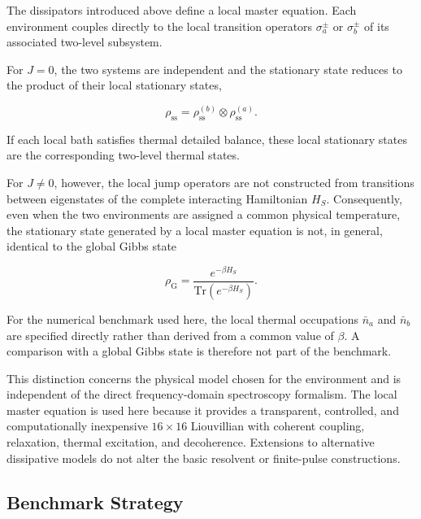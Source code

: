 \documentclass[11pt]{article}
\begin{document}
The dissipators introduced above define a local master equation. Each
environment couples directly to the local transition operators
$\sigma_a^\pm$ or $\sigma_b^\pm$ of its associated two-level
subsystem.

For $J=0$, the two systems are independent and the stationary state
reduces to the product of their local stationary states,

\begin{equation}
\boxed{
\rho_{\mathrm{ss}}
=
\rho_{\mathrm{ss}}^{(b)}
\otimes
\rho_{\mathrm{ss}}^{(a)}.
}
\label{eq:uncoupled_thermal_state}
\end{equation}

If each local bath satisfies thermal detailed balance, these local
stationary states are the corresponding two-level thermal states.

For $J\neq0$, however, the local jump operators are not constructed
from transitions between eigenstates of the complete interacting
Hamiltonian $H_S$. Consequently, even when the two environments are
assigned a common physical temperature, the stationary state generated
by a local master equation is not, in general, identical to the global
Gibbs state

\begin{equation}
\rho_{\mathrm{G}}
=
\frac{
e^{-\beta H_S}
}{
\mathrm{Tr}
\left(
e^{-\beta H_S}
\right)
}.
\end{equation}

For the numerical benchmark used here, the local thermal occupations
$\bar n_a$ and $\bar n_b$ are specified directly rather than derived
from a common value of $\beta$. A comparison with a global Gibbs state
is therefore not part of the benchmark.

This distinction concerns the physical model chosen for the
environment and is independent of the direct frequency-domain
spectroscopy formalism. The local master equation is used here because
it provides a transparent, controlled, and computationally inexpensive
$16\times16$ Liouvillian with coherent coupling, relaxation, thermal
excitation, and decoherence. Extensions to alternative dissipative
models do not alter the basic resolvent or finite-pulse constructions.
\subsection{Benchmark Strategy}
\label{subsec:benchmark_strategy}
\end{document}
